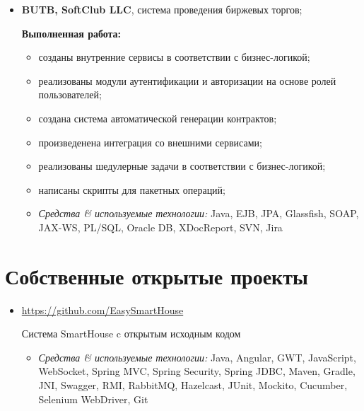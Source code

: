 \documentclass[a4paper, 12pt]{article}
\newcommand{\position}[1]{
    \textbf{#1}}
\newcommand{\itemlabel}[1]{
    \textit{#1:}}
\begin{document}
            \begin{itemize}
        \item \position{BUTB, SoftClub LLC}, система проведения биржевых торгов;

            \textbf{Выполненная работа:}
			\begin{itemize}
  				\item созданы внутренние сервисы в соответствии с бизнес-логикой;
  				\item реализованы модули аутентификации и авторизации на основе ролей пользователей;
  				\item создана система автоматической генерации контрактов;
  				\item произведенена интеграция со внешними сервисами;
  				\item реализованы шедулерные задачи в соответствии с бизнес-логикой;
  				\item написаны скрипты для пакетных операций;
			\end{itemize}
	
            \begin{itemize}
                \item \itemlabel{Средства \& используемые технологии} Java, EJB, JPA, Glassfish, SOAP, JAX-WS, PL/SQL, Oracle DB, XDocReport, SVN, Jira
            \end{itemize}
    \end{itemize}

      
\section*{Собственные открытые проекты}  

  
    \begin{itemize}
        \item \href{https://github.com/EasySmartHouse}{https://github.com/EasySmartHouse}

Система SmartHouse c открытым исходным кодом 
                        
            \begin{itemize}
                \item \itemlabel{Средства \& используемые технологии} Java, Angular, GWT, JavaScript, WebSocket, Spring MVC, Spring Security, Spring JDBC, Maven, Gradle, JNI, Swagger, RMI, RabbitMQ, Hazelcast, JUnit, Mockito, Cucumber, Selenium WebDriver, Git
            \end{itemize}
     \end{itemize}
            
\end{document}
